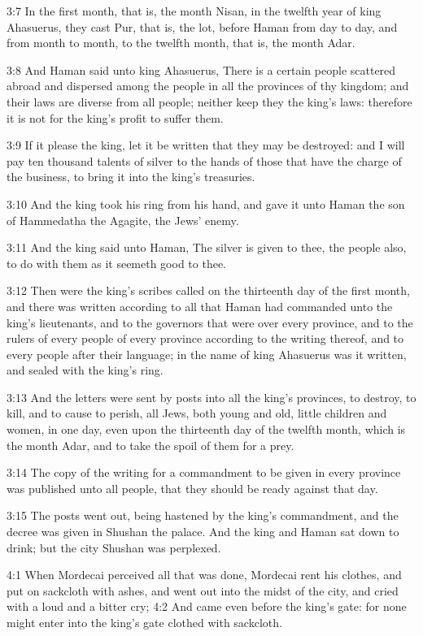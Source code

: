 3:7 In the first month, that is, the month Nisan, in the twelfth year of king Ahasuerus, they cast Pur, that is, the lot, before Haman from day to day, and from month to month, to the twelfth month, that is, the month Adar.

3:8 And Haman said unto king Ahasuerus, There is a certain people scattered abroad and dispersed among the people in all the provinces of thy kingdom; and their laws are diverse from all people; neither keep they the king's laws: therefore it is not for the king's profit to suffer them.

3:9 If it please the king, let it be written that they may be destroyed: and I will pay ten thousand talents of silver to the hands of those that have the charge of the business, to bring it into the king's treasuries.

3:10 And the king took his ring from his hand, and gave it unto Haman the son of Hammedatha the Agagite, the Jews' enemy.

3:11 And the king said unto Haman, The silver is given to thee, the people also, to do with them as it seemeth good to thee.

3:12 Then were the king's scribes called on the thirteenth day of the first month, and there was written according to all that Haman had commanded unto the king's lieutenants, and to the governors that were over every province, and to the rulers of every people of every province according to the writing thereof, and to every people after their language; in the name of king Ahasuerus was it written, and sealed with the king's ring.

3:13 And the letters were sent by posts into all the king's provinces, to destroy, to kill, and to cause to perish, all Jews, both young and old, little children and women, in one day, even upon the thirteenth day of the twelfth month, which is the month Adar, and to take the spoil of them for a prey.

3:14 The copy of the writing for a commandment to be given in every province was published unto all people, that they should be ready against that day.

3:15 The posts went out, being hastened by the king's commandment, and the decree was given in Shushan the palace. And the king and Haman sat down to drink; but the city Shushan was perplexed.

4:1 When Mordecai perceived all that was done, Mordecai rent his clothes, and put on sackcloth with ashes, and went out into the midst of the city, and cried with a loud and a bitter cry; 4:2 And came even before the king's gate: for none might enter into the king's gate clothed with sackcloth.

